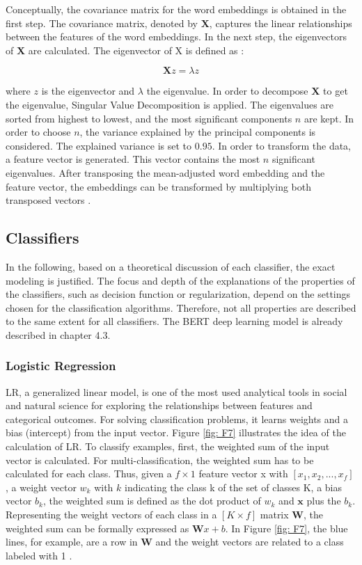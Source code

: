 \documentclass[12pt, a4paper, titlepage]{article}
\begin{document}
Conceptually, the covariance matrix for the word embeddings is obtained in the first step. The covariance matrix, denoted by $\textbf{X}$, captures the linear relationships between the features of the word embeddings. In the next step, the eigenvectors of $\textbf{X}$ are calculated. The eigenvector of X is defined as \citep{bro2014}: 

\[ \textbf{X}z = \lambda z \]

where $z$ is the eigenvector and $\lambda$ the eigenvalue. In order to decompose $\textbf{X}$ to get the eigenvalue, Singular Value Decomposition is applied. The eigenvalues are sorted from highest to lowest, and the most significant components $n$ are kept. In order to choose $n$, the variance explained by the principal components is considered. The explained variance is set to $0.95$. In order to transform the data, a feature vector is generated. This vector contains the most $n$ significant eigenvalues. After transposing the mean-adjusted word embedding and the feature vector, the embeddings can be transformed by multiplying both transposed vectors \citep{smith2002}. 

\subsection{Classifiers}
In the following, based on a theoretical discussion of each classifier, the exact modeling is justified. The focus and depth of the explanations of the properties of the classifiers, such as decision function or regularization, depend on the settings chosen for the classification algorithms. Therefore, not all properties are described to the same extent for all classifiers. The \ac{BERT} deep learning model is already described in chapter 4.3. 

\subsubsection*{Logistic Regression}
\ac{LR}, a generalized linear model, is one of the most used analytical tools in social and natural science for exploring the relationships between features and categorical outcomes. For solving classification problems, it learns weights and a bias (intercept) from the input vector. Figure \ref{fig: F7} illustrates the idea of the calculation of \ac{LR}. To classify examples, first, the weighted sum of the input vector is calculated. For multi-classification, the weighted sum has to be calculated for each class. Thus, given a $f \times 1$ feature vector x with $[x_1, x_2, ..., x_f]$, a weight vector $w_k$ with $k$ indicating the class k of the set of classes K, a bias vector $b_k$, the weighted sum is defined as the dot product of $w_k$ and $\textbf{x}$ plus the $b_k$. Representing the weight vectors of each class in a $[K \times f]$ matrix $\textbf{W}$, the weighted sum can be formally expressed as $\textbf{W}x+b$. In Figure \ref{fig: F7}, the blue lines, for example, are a row in $\textbf{W}$ and the weight vectors are related to a class labeled with 1 \citep{jurafsky2021}.
\end{document}

